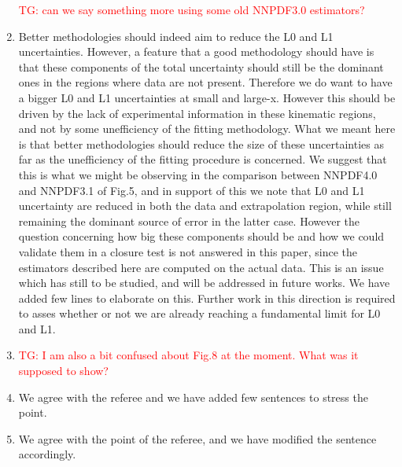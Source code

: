 \documentclass[11pt,a4paper]{article}
\numberwithin{equation}{section}
\numberwithin{figure}{section}
\numberwithin{table}{section}
\begin{document}
\begin{enumerate}
    \textcolor{red}{TG: can we say something more using some old NNPDF3.0 estimators?}
    \item Better methodologies should indeed aim to reduce the L0 and L1 uncertainties.
    However, a feature that a good methodology should have is that these components of the total uncertainty should
    still be the dominant ones in the regions where data are not present.
    Therefore we do want to have a bigger L0 and L1 uncertainties at small and large-x.
    However this should be driven by the lack of experimental information in these kinematic regions,
    and not by some unefficiency of the fitting methodology. What we meant here is that better methodologies 
    should reduce the size of these uncertainties as far as the unefficiency of the fitting procedure
    is concerned. We suggest that this is what we might be observing in the comparison
    between NNPDF4.0 and NNPDF3.1 of Fig.5, and in support of this we note that L0 and L1 uncertainty
    are reduced in both the data and extrapolation region, while still remaining the dominant source of 
    error in the latter case.    
    However the question concerning how big these components should be and how we could validate them 
    in a closure test is not answered in this paper, since the estimators described here 
    are computed on the actual data.
    This is an issue which has still to be studied, and will be addressed in future works.
    We have added few lines to elaborate on this. Further work in this direction is required to 
    asses whether or not we are already reaching a fundamental limit for L0 and L1.  
    \item \textcolor{red}{TG: I am also a bit confused about Fig.8 at the moment. What was it supposed to show?}
    \item We agree with the referee and we have added few sentences to stress the point.
    \item We agree with the point of the referee, and we have modified the sentence accordingly.
\end{enumerate}







\end{document}
